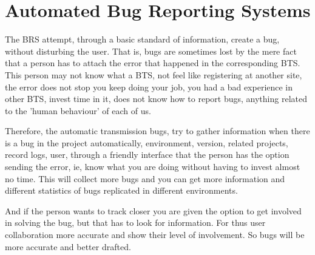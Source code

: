 \documentclass[11pt]{scrartcl}
\begin{document}
\section{Automated Bug Reporting Systems}
\label{sec:auto-brs}

\par The BRS attempt, through a basic standard of information, create a bug, without disturbing the user. That is, bugs are sometimes lost by the mere fact that a person has to attach the error that happened in the corresponding BTS. This person may not know what a BTS, not feel like registering at another site, the error does not stop you keep doing your job, you had a bad experience in other BTS, invest time in it, does not know how to report bugs, anything related to the 'human behaviour' of each of us.

\par Therefore, the automatic transmission bugs, try to gather information when there is a bug in the project automatically, environment, version, related projects, record logs, user, through a friendly interface that the person has the option sending the error, ie, know what you are doing without having to invest almost no time. This will collect more bugs and you can get more information and different statistics of bugs replicated in different environments.

\par And if the person wants to track closer you are given the option to get involved in solving the bug, but that has to look for information. For thus user collaboration more accurate and show their level of involvement. So bugs will be more accurate and better drafted.

\end{document}
